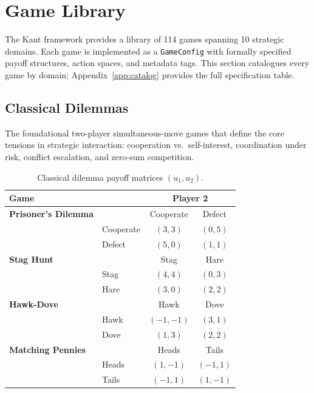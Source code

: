 
\section{Game Library}
\label{sec:game-library}

The Kant framework provides a library of 114 games spanning 10 strategic domains.
Each game is implemented as a \texttt{GameConfig} with formally specified payoff
structures, action spaces, and metadata tags. This section catalogues every game
by domain; Appendix~\ref{app:catalog} provides the full specification table.


\subsection{Classical Dilemmas}
\label{sec:classical}

The foundational two-player simultaneous-move games that define the core tensions
in strategic interaction: cooperation vs.\ self-interest, coordination under risk,
conflict escalation, and zero-sum competition.

\begin{table}[h]
\centering\small
\caption{Classical dilemma payoff matrices $(u_1, u_2)$.}
\label{tab:classical}
\begin{tabular}{@{}ll cc@{}}
\toprule
\textbf{Game} & & \multicolumn{2}{c}{\textbf{Player 2}} \\
\midrule
\textbf{Prisoner's Dilemma} & & Cooperate & Defect \\
& Cooperate & $(3,3)$ & $(0,5)$ \\
& Defect & $(5,0)$ & $(1,1)$ \\
\midrule
\textbf{Stag Hunt} & & Stag & Hare \\
& Stag & $(4,4)$ & $(0,3)$ \\
& Hare & $(3,0)$ & $(2,2)$ \\
\midrule
\textbf{Hawk-Dove} & & Hawk & Dove \\
& Hawk & $(-1,-1)$ & $(3,1)$ \\
& Dove & $(1,3)$ & $(2,2)$ \\
\midrule
\textbf{Matching Pennies} & & Heads & Tails \\
& Heads & $(1,-1)$ & $(-1,1)$ \\
& Tails & $(-1,1)$ & $(1,-1)$ \\
\bottomrule
\end{tabular}
\end{table}


